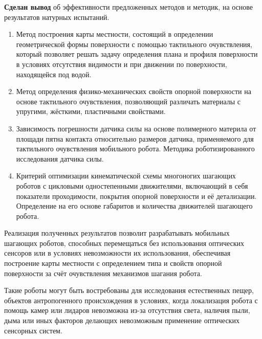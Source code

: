 \textbf{Сделан вывод} об эффективности предложенных методов и методик, на основе результатов натурных испытаний.

{}
\begin{enumerate}[beginpenalty=10000] %
    \item Метод построения карты местности, состоящий в определении геометрической формы поверхности с помощью тактильного очувствления, который позволяет решать задачу определения плана и профиля поверхности в условиях отсутствия видимости и при движении по поверхности, находящейся под водой.
    \item Метод определения физико-механических свойств опорной поверхности на основе тактильного очувствления, позволяющий различать материалы с упругими, жёсткими, пластичными свойствами.
    \item Зависимость погрешности датчика силы на основе полимерного материла от площади пятна контакта относительно размеров датчика, применяемого для тактильного очувствления мобильного робота. Методика роботизированного исследования датчика силы.
    \item Критерий оптимизации кинематической схемы многоногих шагающих роботов с цикловыми одностепенными движителями, включающий в себя показатели проходимости, покрытия опорной поверхности и её детализации. Определение на его основе габаритов и количества движителей шагающего робота.
\end{enumerate}

{\influence} Реализация полученных результатов позволит разрабатывать мобильных шагающих роботов, способных перемещаться без использования оптических сенсоров или в условиях невозможности их использования, обеспечивая построение карты местности с определением типа и свойств опорной поверхности за счёт очувствления механизмов шагания робота. 

Такие роботы могут быть востребованы для исследования естественных пещер, объектов антропогенного происхождения в условиях, когда локализация робота с помощь камер или лидаров невозможна из-за отсутствия света, наличия пыли, дыма или иных факторов делающих невозможным применение оптических сенсорных систем.


